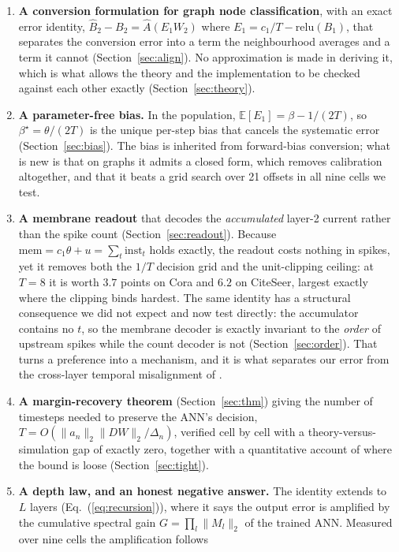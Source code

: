 \documentclass[10pt,twocolumn]{article}
\newcommand{\Ahat}{\hat{A}}
\newcommand{\Bone}{B_{1}}
\newcommand{\Btwo}{B_{2}}
\newcommand{\Btwohat}{\hat{B}_{2}}
\newcommand{\Eone}{E_{1}}
\newcommand{\betastar}{\beta^{\star}}
\newcommand{\anorm}{\lVert a_{n}\rVert_{2}}
\newcommand{\cntone}{c_{1}}
\newcommand{\Deltan}{\Delta_{n}}
\newcommand{\secref}[1]{Section~\ref{#1}}
\newcommand{\eqnref}[1]{Eq.~(\ref{#1})}
\begin{document}
\begin{enumerate}\itemsep2pt
\item \textbf{A conversion formulation for graph node classification}, with an exact error identity,
$\Btwohat - \Btwo = \Ahat(\Eone W_{2})$ where $\Eone = \cntone/T - \mathrm{relu}(\Bone)$, that
separates the conversion error into a term the neighbourhood averages and a term it cannot
(\secref{sec:align}). No approximation is made in deriving it, which is what allows the theory and
the implementation to be checked against each other exactly (\secref{sec:theory}).
\item \textbf{A parameter-free bias.} In the population, $\mathbb{E}[\Eone] = \beta - 1/(2T)$, so
$\betastar = \theta/(2T)$ is the unique per-step bias that cancels the systematic error
(\secref{sec:bias}). The bias is inherited from forward-bias conversion; what is new is that on
graphs it admits a closed form, which removes calibration altogether, and that it beats a grid
search over 21 offsets in all nine cells we test.
\item \textbf{A membrane readout} that decodes the \emph{accumulated} layer-2 current rather than the
spike count (\secref{sec:readout}). Because $\mathrm{mem} = \cntone\theta + u = \sum_t
\mathrm{inst}_t$ holds exactly, the readout costs nothing in spikes, yet it removes both the $1/T$
decision grid and the unit-clipping ceiling: at $T=8$ it is worth $3.7$ points on Cora and $6.2$ on
CiteSeer, largest exactly where the clipping binds hardest. The same identity has a structural
consequence we did not expect and now test directly: the accumulator contains no $t$, so the
membrane decoder is exactly invariant to the \emph{order} of upstream spikes while the count
decoder is not (\secref{sec:order}). That turns a preference into a mechanism, and it is what
separates our error from the cross-layer temporal misalignment of \citet{bojkovic2025temporal}.
\item \textbf{A margin-recovery theorem} (\secref{sec:thm}) giving the number of timesteps needed to
preserve the ANN's decision, $T = O(\anorm \lVert DW\rVert_{2} / \Deltan)$, verified cell by cell
with a theory-versus-simulation gap of exactly zero, together with a quantitative account of where
the bound is loose (\secref{sec:tight}).
\item \textbf{A depth law, and an honest negative answer.} The identity extends to $L$ layers
(\eqnref{eq:recursion}), where it says the output error is amplified by the cumulative spectral gain
$G=\prod_l\lVert M_l\rVert_{2}$ of the trained ANN. Measured over nine cells the amplification follows

\end{enumerate}
\end{document}
